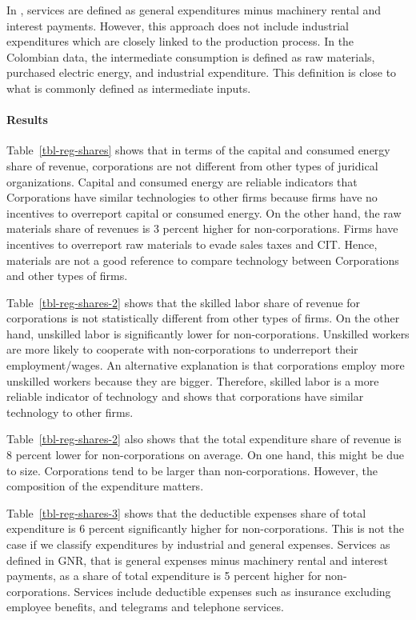\documentclass[
  12pt]{article}
\let\oldparagraph\paragraph
\renewcommand{\paragraph}[1]{\oldparagraph{#1}\mbox{}}
\theoremstyle{definition}
\theoremstyle{remark}
\begin{document}
In \citet{Gandhi2020}, services are defined as general expenditures
minus machinery rental and interest payments. However, this approach
does not include industrial expenditures which are closely linked to the
production process. In the Colombian data, the intermediate consumption
is defined as raw materials, purchased electric energy, and industrial
expenditure. This definition is close to what is commonly defined as
intermediate inputs.

\paragraph{Results}\label{results}

Table~\ref{tbl-reg-shares} shows that in terms of the capital and
consumed energy share of revenue, corporations are not different from
other types of juridical organizations. Capital and consumed energy are
reliable indicators that Corporations have similar technologies to other
firms because firms have no incentives to overreport capital or consumed
energy. On the other hand, the raw materials share of revenues is 3
percent higher for non-corporations. Firms have incentives to overreport
raw materials to evade sales taxes and CIT. Hence, materials are not a
good reference to compare technology between Corporations and other
types of firms.

Table~\ref{tbl-reg-shares-2} shows that the skilled labor share of
revenue for corporations is not statistically different from other types
of firms. On the other hand, unskilled labor is significantly lower for
non-corporations. Unskilled workers are more likely to cooperate with
non-corporations to underreport their employment/wages. An alternative
explanation is that corporations employ more unskilled workers because
they are bigger. Therefore, skilled labor is a more reliable indicator
of technology and shows that corporations have similar technology to
other firms.

Table~\ref{tbl-reg-shares-2} also shows that the total expenditure share
of revenue is 8 percent lower for non-corporations on average. On one
hand, this might be due to size. Corporations tend to be larger than
non-corporations. However, the composition of the expenditure matters.

Table~\ref{tbl-reg-shares-3} shows that the deductible expenses share of
total expenditure is 6 percent significantly higher for
non-corporations. This is not the case if we classify expenditures by
industrial and general expenses. Services as defined in GNR, that is
general expenses minus machinery rental and interest payments, as a
share of total expenditure is 5 percent higher for non-corporations.
Services include deductible expenses such as insurance excluding
employee benefits, and telegrams and telephone services.
\end{document}
